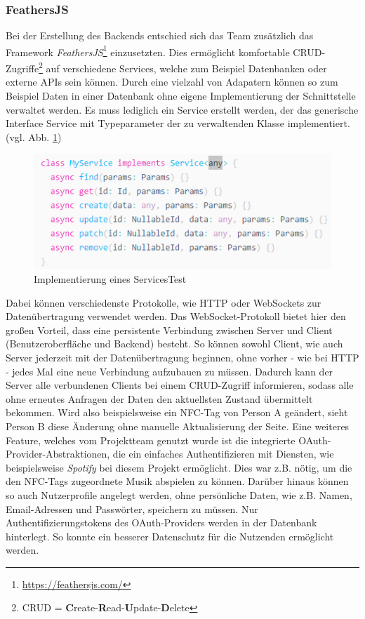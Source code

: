 \documentclass[10pt, a4paper]{article}
\newcommand*\setcaptioncitation[1]{\def\captioncitation{\textit{Source:}~#1}}
\let\captioncitation\relax
\begin{document}
\subsubsection*{FeathersJS}
Bei der Erstellung des Backends entschied sich das Team zusätzlich das Framework \textit{FeathersJS}\footnote{\raggedright\url{https://feathersjs.com/}} einzusetzten.
Dies ermöglicht komfortable CRUD-Zugriffe\footnote{CRUD = \textbf{C}reate-\textbf{R}ead-\textbf{U}pdate-\textbf{D}elete}  auf verschiedene Services, welche zum Beispiel Datenbanken oder externe APIs sein können.
Durch eine vielzahl von Adapatern können so zum Beispiel Daten in einer Datenbank ohne eigene Implementierung der Schnittstelle verwaltet werden.
Es muss lediglich ein Service erstellt werden, der das generische Interface Service mit Typeparameter der zu verwaltenden Klasse implementiert. (vgl. Abb. \ref{fig:MyService})
\begin{figure}[h]
  \includegraphics[width=\linewidth]{MyFeathersService}
  \setcaptioncitation{https://docs.feathersjs.com/guides/basics/services.html}
  \caption{Implementierung eines ServicesTest}
  \label{fig:MyService}
\end{figure}
Dabei können verschiedenste Protokolle, wie HTTP oder WebSockets zur Datenübertragung verwendet werden.
Das WebSocket-Protokoll bietet hier den großen Vorteil, dass eine persistente Verbindung zwischen Server und Client (Benutzeroberfläche und Backend) besteht.
So können sowohl Client, wie auch Server jederzeit mit der Datenübertragung beginnen, ohne vorher - wie bei HTTP - jedes Mal eine neue Verbindung aufzubauen zu müssen. \cite{WebSockets}
Dadurch kann der Server alle verbundenen Clients bei einem CRUD-Zugriff informieren, sodass alle ohne erneutes Anfragen der Daten den aktuellsten Zustand übermittelt bekommen.
Wird also beispielsweise ein NFC-Tag von Person A geändert, sieht Person B diese Änderung ohne manuelle Aktualisierung der Seite.
Eine weiteres Feature, welches vom Projektteam genutzt wurde ist die integrierte OAuth-Provider-Abstraktionen, die ein einfaches Authentifizieren mit Diensten, wie beispielsweise \textit{Spotify} bei diesem Projekt ermöglicht.
Dies war z.B. nötig, um die den NFC-Tags zugeordnete Musik abspielen zu können.
Darüber hinaus können so auch Nutzerprofile angelegt werden, ohne persönliche Daten, wie z.B. Namen, Email-Adressen und Passwörter, speichern zu müssen.
Nur Authentifizierungstokens des OAuth-Providers werden in der Datenbank hinterlegt.
So konnte ein besserer Datenschutz für die Nutzenden ermöglicht werden.
\end{document}
